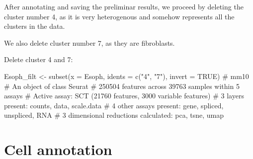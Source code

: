 \documentclass[
  letterpaper,
  DIV=11,
  numbers=noendperiod]{scrreprt}
\newenvironment{Shaded}{\begin{snugshade}}{\end{snugshade}}
\newcommand{\AttributeTok}[1]{\textcolor[rgb]{0.40,0.45,0.13}{#1}}
\newcommand{\CommentTok}[1]{\textcolor[rgb]{0.37,0.37,0.37}{#1}}
\newcommand{\ConstantTok}[1]{\textcolor[rgb]{0.56,0.35,0.01}{#1}}
\newcommand{\FunctionTok}[1]{\textcolor[rgb]{0.28,0.35,0.67}{#1}}
\newcommand{\NormalTok}[1]{\textcolor[rgb]{0.00,0.23,0.31}{#1}}
\newcommand{\OtherTok}[1]{\textcolor[rgb]{0.00,0.23,0.31}{#1}}
\newcommand{\StringTok}[1]{\textcolor[rgb]{0.13,0.47,0.30}{#1}}
\begin{document}
After annotating and saving the preliminar results, we proceed by
deleting the cluster number 4, as it is very heterogenous and somehow
represents all the clusters in the data.

We also delete cluster number 7, as they are fibroblasts.

Delete cluster 4 and 7:

\begin{Shaded}
\begin{Highlighting}[]
\NormalTok{Esoph\_filt }\OtherTok{\textless{}{-}} \FunctionTok{subset}\NormalTok{(}\AttributeTok{x =}\NormalTok{ Esoph, }\AttributeTok{idents =} \FunctionTok{c}\NormalTok{(}\StringTok{"4"}\NormalTok{, }\StringTok{"7"}\NormalTok{), }\AttributeTok{invert =} \ConstantTok{TRUE}\NormalTok{)}
\CommentTok{\# mm10}
\CommentTok{\# An object of class Seurat }
\CommentTok{\# 250504 features across 39763 samples within 5 assays }
\CommentTok{\# Active assay: SCT (21760 features, 3000 variable features)}
\CommentTok{\#  3 layers present: counts, data, scale.data}
\CommentTok{\#  4 other assays present: gene, spliced, unspliced, RNA}
\CommentTok{\#  3 dimensional reductions calculated: pca, tsne, umap}
\end{Highlighting}
\end{Shaded}

\section{Cell annotation}\label{cell-annotation}
\end{document}
